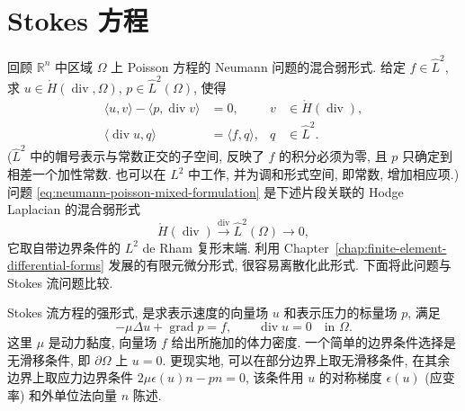\section{{Stokes 方程}}\label{sec:stokes-equations}

{回顾 $\mathbb R^n$ 中区域 $\Omega$ 上 Poisson 方程的 Neumann 问题的混合弱形式. 给定 $f\in\hat L^2$, 求 $u\in\mathring H(\operatorname{div},\Omega)$, $p\in\hat L^2(\Omega)$, 使得}
\begin{equation}\label{eq:neumann-poisson-mixed-formulation}
\begin{aligned}\langle u,v\rangle-\langle p,\operatorname{div}v\rangle&=0,&v&\in\mathring H(\operatorname{div}),\\\langle\operatorname{div}u,q\rangle&=\langle f,q\rangle,&q&\in\hat L^2.\end{aligned}
\end{equation}
{($\hat L^2$ 中的帽号表示与常数正交的子空间, 反映了 $f$ 的积分必须为零, 且 $p$ 只确定到相差一个加性常数. 也可以在 $L^2$ 中工作, 并为调和形式空间, 即常数, 增加相应项.) 问题 \eqref{eq:neumann-poisson-mixed-formulation} 是下述片段关联的 Hodge Laplacian 的混合弱形式}
\begin{equation}\label{eq:neumann-divergence-complex}
\mathring H(\operatorname{div})\xrightarrow{\operatorname{div}}\hat L^2(\Omega)\to0,
\end{equation}
{它取自带边界条件的 $L^2$ de Rham 复形末端. 利用 Chapter~\ref{chap:finite-element-differential-forms} 发展的有限元微分形式, 很容易离散化此形式. 下面将此问题与 Stokes 流问题比较.}

{Stokes 流方程的强形式, 是求表示速度的向量场 $u$ 和表示压力的标量场 $p$, 满足}
\[
-\mu\Delta u+\operatorname{grad}p=f,\qquad\operatorname{div}u=0\quad\text{in }\Omega.
\]
{这里 $\mu$ 是动力黏度, 向量场 $f$ 给出所施加的体力密度. 一个简单的边界条件选择是无滑移条件, 即 $\partial\Omega$ 上 $u=0$. 更现实地, 可以在部分边界上取无滑移条件, 在其余边界上取应力边界条件 $2\mu\epsilon(u)n-pn=0$, 该条件用 $u$ 的对称梯度 $\epsilon(u)$ (应变率) 和外单位法向量 $n$ 陈述.}

